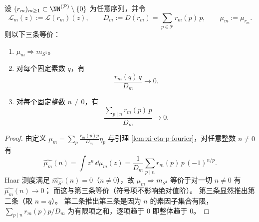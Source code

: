 \begin{theorem}\label{thm:xi-leyang-prime-register-haar-criterion}
设 \((r_m)_{m\ge 1}\subset \NN^{(\mathcal P)}\setminus\{0\}\) 为任意序列，并令
\[
\mathcal L_m(z):=\mathcal L(r_m)(z),
\qquad
D_m:=D(r_m)=\sum_{p\in\mathcal P}r_m(p)\,p,
\qquad
\mu_m:=\mu_{r_m}.
\]
则以下三条等价：
\begin{enumerate}
  \item \(\mu_m\Rightarrow m_{S^1}\)。
  \item 对每个固定素数 \(q\)，有
  \[
  \frac{r_m(q)\,q}{D_m}\longrightarrow 0.
  \]
  \item 对每个固定整数 \(n\neq 0\)，有
  \[
  \frac{\sum_{p\mid n}r_m(p)\,p}{D_m}\longrightarrow 0.
  \]
\end{enumerate}
\end{theorem}
\begin{proof}
由定义 \(\mu_m=\sum_p \frac{r_m(p)p}{D_m}\eta_p\) 与引理 \ref{lem:xi-eta-p-fourier}，对任意整数 \(n\neq 0\) 有
\[
\widehat{\mu_m}(n)
=\int z^n\,\dd\mu_m(z)
=\frac1{D_m}\sum_{p\mid n}r_m(p)\,p\,(-1)^{n/p}.
\]
Haar 测度满足 \(\widehat{m_{S^1}}(n)=0\)（\(n\neq 0\)），故 \(\mu_m\Rightarrow m_{S^1}\) 等价于对一切 \(n\neq 0\) 有 \(\widehat{\mu_m}(n)\to 0\)；
而这与第三条等价（符号项不影响绝对值阶）。
第三条显然推出第二条（取 \(n=q\)）。
第二条推出第三条是因为 \(n\) 的素因子集合有限，\(\sum_{p\mid n}r_m(p)p/D_m\) 为有限项之和，逐项趋于 \(0\) 即整体趋于 \(0\)。
\end{proof}

